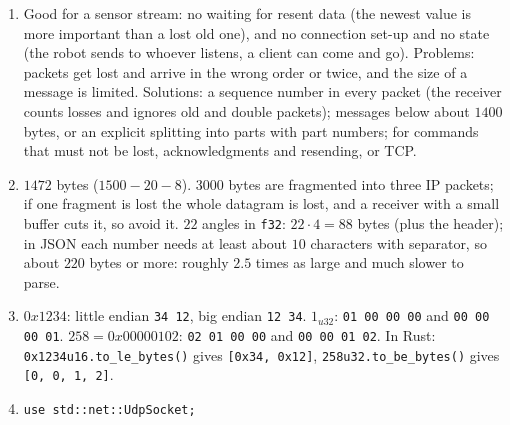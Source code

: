 \begin{enumerate}[label=\textbf{\ansnum.\arabic*}]
  \item Good for a sensor stream: no waiting for resent data (the newest value is more important than a lost old one), and no connection set-up and no state (the robot sends to whoever listens, a client can come and go). Problems: packets get lost and arrive in the wrong order or twice, and the size of a message is limited. Solutions: a sequence number in every packet (the receiver counts losses and ignores old and double packets); messages below about $1400$ bytes, or an explicit splitting into parts with part numbers; for commands that must not be lost, acknowledgments and resending, or TCP.
  \item $1472$ bytes ($1500-20-8$). $3000$ bytes are fragmented into three IP packets; if one fragment is lost the whole datagram is lost, and a receiver with a small buffer cuts it, so avoid it. $22$ angles in \verb!f32!: $22\cdot4=88$ bytes (plus the header); in JSON each number needs at least about $10$ characters with separator, so about $220$ bytes or more: roughly $2.5$ times as large and much slower to parse.
  \item $0x1234$: little endian \verb!34 12!, big endian \verb!12 34!. $1_{u32}$: \verb!01 00 00 00! and \verb!00 00 00 01!. $258=0x00000102$: \verb!02 01 00 00! and \verb!00 00 01 02!. In Rust: \verb!0x1234u16.to_le_bytes()! gives \verb![0x34, 0x12]!, \verb!258u32.to_be_bytes()! gives \verb![0, 0, 1, 2]!.
  \item
\begin{verbatim}
use std::net::UdpSocket;


\end{verbatim}
\end{enumerate}
